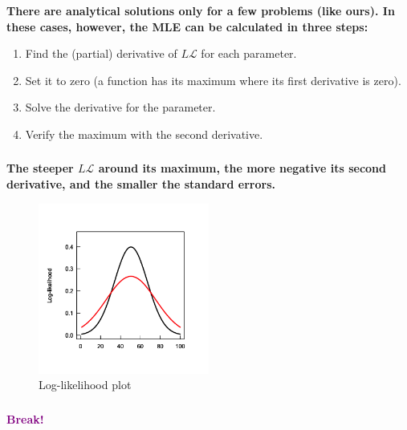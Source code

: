 \documentclass{beamer}
\begin{document}
\begin{frame}
    \frametitle{}
    \textbf{There are analytical solutions only for a few problems (like ours). In these cases, however, the MLE can be calculated in three steps:}
    \begin{enumerate}
        \item Find the (partial) derivative of $L\mathcal{L}$ for each parameter.
        \item Set it to zero (a function has its maximum where its first derivative is zero).
        \item Solve the derivative for the parameter.
        \item Verify the maximum with the second derivative.
    \end{enumerate}
\end{frame}

\begin{frame}
    \frametitle{}
    \textbf{The steeper $L\mathcal{L}$ around its maximum, the more negative its second derivative, and the smaller the standard errors.}
    
    \begin{figure}[h]
        \centering
        \includegraphics[width=0.5\textwidth]{lectures/day_2_LM_refresh_I/figures/unnamed-chunk-19-1.png} 
        \caption{Log-likelihood plot}
    \end{figure}
\end{frame}

\begin{frame}
    \frametitle{}
    \begin{center}
        \huge\textbf{\textcolor{purple}{Break!}}
    \end{center}
\end{frame}
\end{document}
